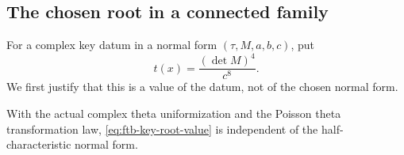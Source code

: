 \subsection{The chosen root in a connected family}
\label{sec:ftb-key-connected-root}

For a complex key datum in a normal form \((\tau,M,a,b,c)\), put
\[
                            t(x)=\frac{(\det M)^4}{c^8}.
 \tag{R1}\label{eq:ftb-key-root-value}
\]
We first justify that this is a value of the datum, not of the
chosen normal form.

\begin{srlemma}
\label{lem:ftb-key-normal-value-unique}
With the actual complex theta uniformization and the Poisson theta
transformation law, \eqref{eq:ftb-key-root-value} is independent of
the half-characteristic normal form.
\end{srlemma}
